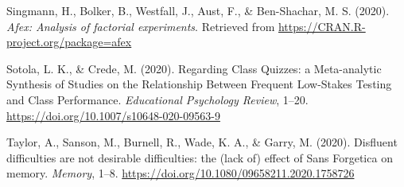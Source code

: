 \documentclass[
  english,
  man]{apa6}
\begin{document}
\leavevmode\hypertarget{ref-Singmann2020}{}%
Singmann, H., Bolker, B., Westfall, J., Aust, F., \& Ben-Shachar, M. S. (2020). \emph{Afex: Analysis of factorial experiments}. Retrieved from \url{https://CRAN.R-project.org/package=afex}

\leavevmode\hypertarget{ref-Sotola2020}{}%
Sotola, L. K., \& Crede, M. (2020). Regarding Class Quizzes: a Meta-analytic Synthesis of Studies on the Relationship Between Frequent Low-Stakes Testing and Class Performance. \emph{Educational Psychology Review}, 1--20. \url{https://doi.org/10.1007/s10648-020-09563-9}

\leavevmode\hypertarget{ref-Taylor2020}{}%
Taylor, A., Sanson, M., Burnell, R., Wade, K. A., \& Garry, M. (2020). Disfluent difficulties are not desirable difficulties: the (lack of) effect of Sans Forgetica on memory. \emph{Memory}, 1--8. \url{https://doi.org/10.1080/09658211.2020.1758726}

\endgroup
\end{document}
